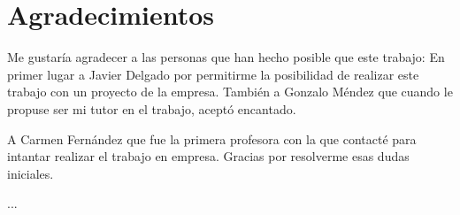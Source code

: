 \chapter*{Agradecimientos}
	Me gustaría agradecer a las personas que han hecho posible que este trabajo:
	En primer lugar a Javier Delgado por permitirme la posibilidad de realizar este trabajo con un proyecto de la empresa.
	También a Gonzalo Méndez que cuando le propuse ser mi tutor en el trabajo, aceptó encantado.

	A Carmen Fernández que fue la primera profesora con la que contacté para intantar realizar el trabajo en empresa.
	Gracias por resolverme esas dudas iniciales.

	...

		
